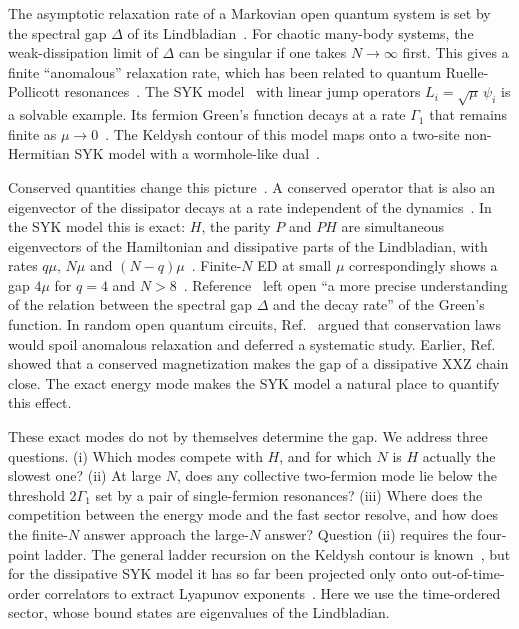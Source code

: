 \documentclass[aps,pre,twocolumn,superscriptaddress,amsmath,amssymb,10pt]{revtex4-2}
\begin{document}
The asymptotic relaxation rate of a Markovian open quantum system is set by the spectral gap $\Delta$ of its Lindbladian~\cite{Kessler2012,Minganti2018}. For chaotic many-body systems, the weak-dissipation limit of $\Delta$ can be singular if one takes $N\to\infty$ first. This gives a finite ``anomalous'' relaxation rate, which has been related to quantum Ruelle-Pollicott resonances~\cite{Prosen2002,Mori2024,Jacoby2025,Zhang2026}. The SYK model~\cite{SY1993,Kitaev2015,MS2016} with linear jump operators $L_i=\sqrt\mu\,\psi_i$ is a solvable example. Its fermion Green's function decays at a rate $\Gamma_1$ that remains finite as $\mu\to0$~\cite{Kulkarni2022,Garcia2023}. The Keldysh contour of this model maps onto a two-site non-Hermitian SYK model with a wormhole-like dual~\cite{Garcia2023,MQ2018}.

Conserved quantities change this picture~\cite{Mori2024,Yang2025}. A conserved operator that is also an eigenvector of the dissipator decays at a rate independent of the dynamics~\cite{Teretenkov2024}. In the SYK model this is exact: $H$, the parity $P$ and $PH$ are simultaneous eigenvectors of the Hamiltonian and dissipative parts of the Lindbladian, with rates $q\mu$, $N\mu$ and $(N-q)\mu$~\cite{Garcia2026}. Finite-$N$ ED at small $\mu$ correspondingly shows a gap $4\mu$ for $q=4$ and $N>8$~\cite{Garcia2023}. Reference~\cite{Garcia2023} left open ``a more precise understanding of the relation between the spectral gap $\Delta$ and the decay rate'' of the Green's function. In random open quantum circuits, Ref.~\cite{Yoshimura2024} argued that conservation laws would spoil anomalous relaxation and deferred a systematic study. Earlier, Ref.~\cite{Cai2013} showed that a conserved magnetization makes the gap of a dissipative XXZ chain close. The exact energy mode makes the SYK model a natural place to quantify this effect.

These exact modes do not by themselves determine the gap. We address three questions. (i) Which modes compete with $H$, and for which $N$ is $H$ actually the slowest one? (ii) At large $N$, does any collective two-fermion mode lie below the threshold $2\Gamma_1$ set by a pair of single-fermion resonances? (iii) Where does the competition between the energy mode and the fast sector resolve, and how does the finite-$N$ answer approach the large-$N$ answer? Question (ii) requires the four-point ladder. The general ladder recursion on the Keldysh contour is known~\cite{Liu2026}, but for the dissipative SYK model it has so far been projected only onto out-of-time-order correlators to extract Lyapunov exponents~\cite{Garcia2024,Liu2026,Pelliconi2026}. Here we use the time-ordered sector, whose bound states are eigenvalues of the Lindbladian.
\end{document}
